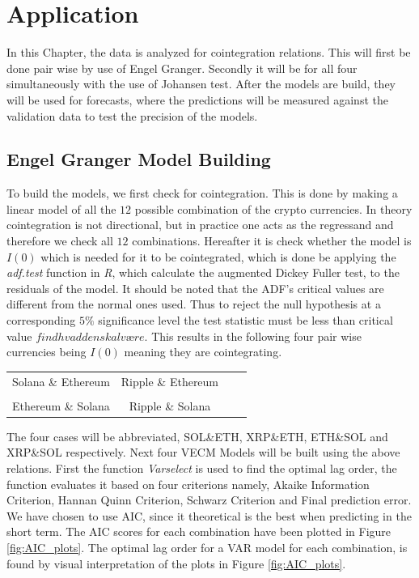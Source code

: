 \chapter{Application}
In this Chapter, the data is analyzed for cointegration relations. This will first be done pair wise by use of Engel Granger. Secondly it will be for all four simultaneously with the use of Johansen test. After the models are build, they will be used for forecasts, where the predictions will be measured against the validation data to test the precision of the models.


\section{Engel Granger Model Building}
To build the models, we first check for cointegration. This is done by making a linear model of all the $12$ possible combination of the crypto currencies. In theory cointegration is not directional, but in practice one acts as the regressand and therefore we check all $12$ combinations. Hereafter it is check whether the model is $I(0)$ which is needed for it to be cointegrated, which is done be applying the \textit{adf.test} function in \textit{R}, which calculate the augmented Dickey Fuller test, to the residuals of the model. It should be noted that the ADF's critical values are different from the normal ones used. Thus to reject the null hypothesis at a corresponding $5\%$ significance level the test statistic must be less than critical value $find hvad den skal være$. This results in the following four pair wise currencies being $I(0)$ meaning they are cointegrating. 
\pause
\begin{center}
\begin{tabular}{cccc}
   Solana \& Ethereum \quad & \quad Ripple \& Ethereum\\\\
   Ethereum \& Solana \quad & \quad Ripple \& Solana
\end{tabular}
\end{center}
\pause
\noindent The four cases will be abbreviated, SOL\&ETH, XRP\&ETH, ETH\&SOL and XRP\&SOL respectively. Next four VECM Models will be built using the above relations. First the function \textit{Varselect} is used to find the optimal lag order, the function evaluates it based on four criterions namely, Akaike Information Criterion, Hannan Quinn Criterion, Schwarz Criterion and Final prediction error. We have chosen to use AIC, since it theoretical is the best when predicting in the short term. The AIC scores for each combination have been plotted in Figure \ref{fig:AIC_plots}. The optimal lag order for a VAR model for each combination, is found by visual interpretation of the plots in Figure \ref{fig:AIC_plots}.
